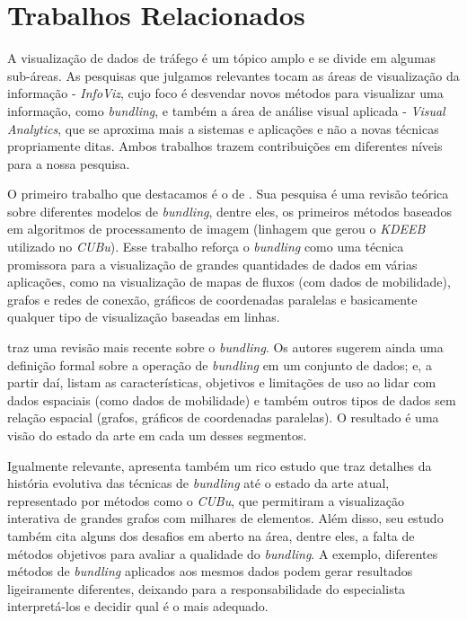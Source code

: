 \chapter{Trabalhos Relacionados}
\label{cap:trabalhos-relacionados}

  A visualização de dados de tráfego é um tópico amplo e se divide em
algumas sub-áreas. As pesquisas que julgamos relevantes tocam as áreas de
visualização da informação - \emph{InfoViz}, cujo foco é desvendar novos métodos
para visualizar uma informação, como \emph{bundling}, e também a área de análise
visual aplicada - \emph{Visual Analytics}, que se aproxima mais a sistemas e
aplicações e não a novas técnicas propriamente ditas. Ambos trabalhos trazem
contribuições em diferentes níveis para a nossa pesquisa.

O primeiro trabalho que destacamos é o de \citet{Zhou2013}. Sua pesquisa é uma
revisão teórica sobre diferentes modelos de \emph{bundling}, dentre eles, os
primeiros métodos baseados em algoritmos de processamento de imagem (linhagem
que gerou o \emph{KDEEB} utilizado no \emph{CUBu}). Esse trabalho reforça o
\emph{bundling} como uma técnica promissora para a visualização de grandes
quantidades de dados em várias aplicações, como na visualização de mapas de
fluxos (com dados de mobilidade), grafos e redes de conexão,
gráficos de coordenadas paralelas e basicamente qualquer tipo de visualização
baseadas em linhas.

\citet{Lhuillier2017} traz uma revisão mais recente sobre o \emph{bundling}. Os
autores sugerem ainda uma definição formal sobre a operação de \emph{bundling}
em um conjunto de dados; e, a partir daí, listam as características, objetivos e
limitações de uso ao lidar com dados espaciais (como dados de mobilidade) e
também outros tipos de dados sem relação espacial (grafos, gráficos de
coordenadas paralelas). O resultado é uma visão do estado da arte em
cada um desses segmentos.

Igualmente relevante, \citet{Telea2018} apresenta também um rico estudo que traz
detalhes da história evolutiva das técnicas de \emph{bundling} até o estado da
arte atual, representado por métodos como o \emph{CUBu}, que permitiram a
visualização interativa de grandes grafos com milhares de elementos. Além disso,
seu estudo também cita alguns dos desafios em aberto na área, dentre eles, a
falta de métodos objetivos para avaliar a qualidade do \emph{bundling}. A exemplo,
diferentes métodos de \emph{bundling} aplicados aos mesmos dados podem gerar resultados
ligeiramente diferentes, deixando para a responsabilidade do especialista interpretá-los
e decidir qual é o mais adequado.

